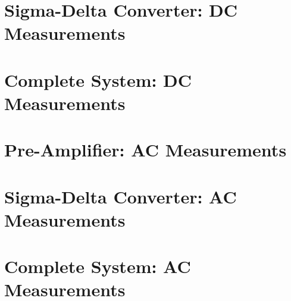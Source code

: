\section{Sigma-Delta Converter: DC Measurements}
\label{sec:sigdelDC}

\section{Complete System: DC Measurements}
\label{sec:systemDC}

\section{Pre-Amplifier: AC Measurements}
\label{sec:preAmpAC}

\section{Sigma-Delta Converter: AC Measurements}
\label{sec:sigdelAC}

\section{Complete System: AC Measurements}
\label{sec:systemAC}


